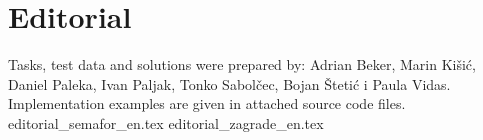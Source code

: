 \documentclass[a4paper]{article}
\date{October 3rd 2020.}
\begin{document}
\section*{Editorial}
Tasks, test data and solutions were prepared by:
Adrian Beker, Marin Kišić,
Daniel Paleka, Ivan Paljak, Tonko Sabolčec, Bojan Štetić i Paula Vidas.
Implementation examples are given in attached source code files.
\clearpage
\clearpage
{editorial_semafor_en.tex}
\clearpage
{editorial_zagrade_en.tex}
\clearpage
\end{document}
